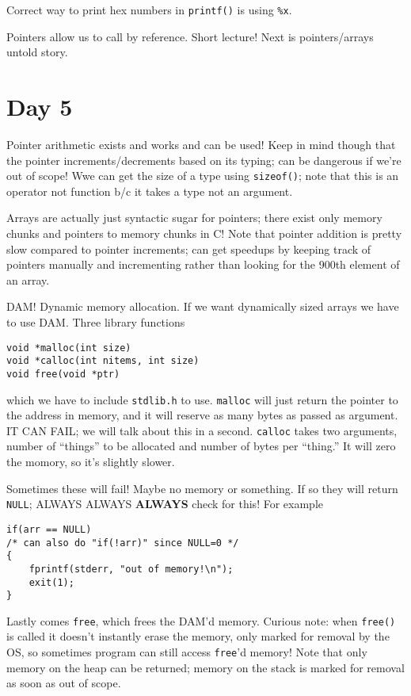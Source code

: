\documentclass[10pt,landscape, twocolumn]{article}
\begin{document}
Correct way to print hex numbers in \texttt{printf()} is using \texttt{\%x}.

Pointers allow us to call by reference. Short lecture! Next is pointers/arrays untold story.

\section*{Day 5}

Pointer arithmetic exists and works and can be used! Keep in mind though that the pointer increments/decrements based on its typing; can be dangerous if we're out of scope! Wwe can get the size of a type using \texttt{sizeof()}; note that this is an operator not function b/c it takes a type not an argument.

Arrays are actually just syntactic sugar for pointers; there exist only memory chunks and pointers to memory chunks in C! Note that pointer addition is pretty slow compared to pointer increments; can get speedups by keeping track of pointers manually and incrementing rather than looking for the 900th element of an array.

DAM! Dynamic memory allocation. If we want dynamically sized arrays we have to use DAM. Three library functions
\begin{verbatim}
void *malloc(int size)
void *calloc(int nitems, int size)
void free(void *ptr)
\end{verbatim}
which we have to include \texttt{stdlib.h} to use. \texttt{malloc} will just return the pointer to the address in memory, and it will reserve as many bytes as passed as argument. IT CAN FAIL; we will talk about this in a second. \texttt{calloc} takes two arguments, number of ``things'' to be allocated and number of bytes per ``thing.'' It will zero the momory, so it's slightly slower.

Sometimes these will fail! Maybe no memory or something. If so they will return \texttt{NULL}; ALWAYS ALWAYS \textbf{ALWAYS} check for this! For example
\begin{verbatim}
if(arr == NULL)
/* can also do "if(!arr)" since NULL=0 */
{
    fprintf(stderr, "out of memory!\n");
    exit(1);
}
\end{verbatim}

Lastly comes \texttt{free}, which frees the DAM'd memory. Curious note: when \texttt{free()} is called it doesn't instantly erase the memory, only marked for removal by the OS, so sometimes program can still access \texttt{free}'d memory! Note that only memory on the heap can be returned; memory on the stack is marked for removal as soon as out of scope.
\end{document}
